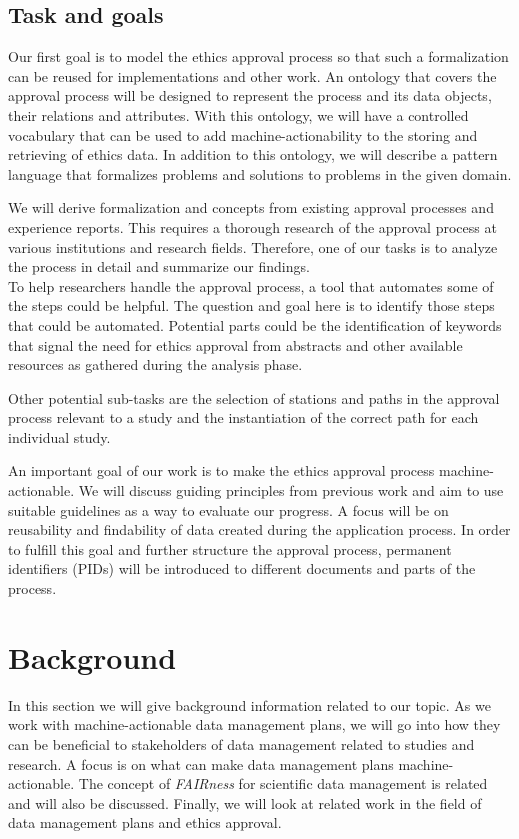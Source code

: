 \documentclass[10pt]{article}
\begin{document}
\subsection{Task and goals}

Our first goal is to model the ethics approval process so that such a formalization can be reused for implementations and other work. An ontology that covers the approval process will be designed to represent the process and its data objects, their relations and attributes. With this ontology, we will have a controlled vocabulary that can be used to add machine-actionability to the storing and retrieving of ethics data. In addition to this ontology, we will describe a pattern language that formalizes problems and solutions to problems in the given domain. 

We will derive formalization and concepts from existing approval processes and experience reports. This requires a thorough research of the approval process at various institutions and research fields. Therefore, one of our tasks is to analyze the process in detail and summarize our findings.\\

To help researchers handle the approval process, a tool that automates some of the steps could be helpful. The question and goal here is to identify those steps that could be automated. Potential parts could be the identification of keywords that signal the need for ethics approval from abstracts and other available resources as gathered during the analysis phase. 

Other potential sub-tasks are the selection of stations and paths in the approval process relevant to a study and the instantiation of the correct path for each individual study. 

An important goal of our work is to make the ethics approval process machine-actionable. We will discuss guiding principles from previous work and aim to use suitable guidelines as a way to evaluate our progress. A focus will be on reusability and findability of data created during the application process. In order to fulfill this goal and further structure the approval process, permanent identifiers (PIDs) will be introduced to different documents and parts of the process.


\newpage

\section{Background}
\label{sec:background}
In this section we will give background information related to our topic. As we work with machine-actionable data management plans, we will go into how they can be beneficial to stakeholders of data management related to studies and research. A focus is on what can make data management plans machine-actionable. The concept of \textit{FAIRness} for scientific data management is related and will also be discussed. Finally, we will look at related work in the field of data management plans and ethics approval.
\end{document}
